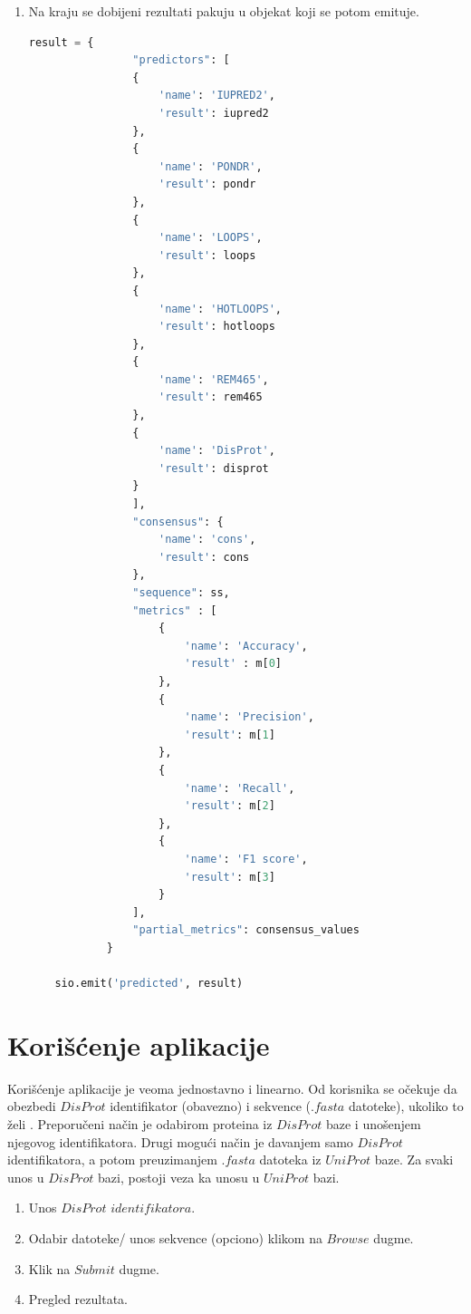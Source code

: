 \begin{enumerate}
\item Na kraju se dobijeni rezultati pakuju u objekat koji se potom emituje.

\begin{lstlisting}[language=Python]
result = {
                "predictors": [
                {
                    'name': 'IUPRED2',
                    'result': iupred2
                },
                {
                    'name': 'PONDR',
                    'result': pondr 
                }, 
                {
                    'name': 'LOOPS',
                    'result': loops 
                },
                {
                    'name': 'HOTLOOPS',
                    'result': hotloops 
                },
                {
                    'name': 'REM465',
                    'result': rem465 
                },
                {
                    'name': 'DisProt',
                    'result': disprot 
                }
                ],
                "consensus": {
                    'name': 'cons',
                    'result': cons
                },
                "sequence": ss,
                "metrics" : [
                    {
                        'name': 'Accuracy',
                        'result' : m[0]
                    },
                    {
                        'name': 'Precision',
                        'result': m[1] 
                    },
                    {
                        'name': 'Recall',
                        'result': m[2] 
                    },
                    {
                        'name': 'F1 score',
                        'result': m[3] 
                    }
                ],
                "partial_metrics": consensus_values
            }
    
    sio.emit('predicted', result)
\end{lstlisting}
\end{enumerate}

\section{Korišćenje aplikacije}
Korišćenje aplikacije je veoma jednostavno i linearno. Od korisnika se očekuje da obezbedi $DisProt$ identifikator (obavezno) i sekvence ($.fasta$ datoteke), ukoliko to želi . Preporučeni način je odabirom proteina iz $DisProt$ baze i unošenjem njegovog identifikatora. Drugi mogući način je davanjem samo $DisProt$ identifikatora, a potom preuzimanjem $.fasta$ datoteka iz $UniProt$ baze. Za svaki unos u $DisProt$ bazi, postoji veza ka unosu u $UniProt$ bazi. 
\begin{enumerate}
\item Unos $DisProt$ $identifikatora$.
\item Odabir datoteke/ unos sekvence (opciono) klikom na $Browse$ dugme.
\item Klik na $Submit$ dugme.
\item Pregled rezultata.
\end{enumerate}

